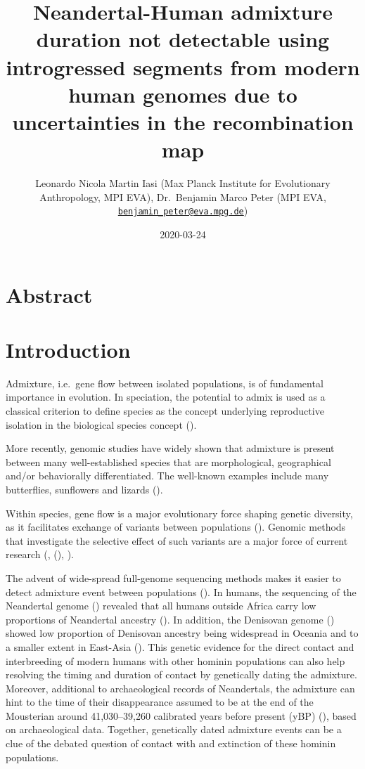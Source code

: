 \documentclass[]{article}
\title{Neandertal-Human admixture duration not detectable using introgressed
segments from modern human genomes due to uncertainties in the
recombination map}
\author{Leonardo Nicola Martin Iasi (Max Planck Institute for Evolutionary
Anthropology, MPI EVA), Dr.~Benjamin Marco Peter (MPI EVA,
\href{mailto:benjamin_peter@eva.mpg.de}{\nolinkurl{benjamin\_peter@eva.mpg.de}})}
\date{2020-03-24}
\begin{document}
\maketitle

\section{Abstract}\label{abstract}

\section{Introduction}\label{introduction}

Admixture, i.e.~gene flow between isolated populations,
 is of fundamental importance in evolution. In 
speciation, the  
potential to admix is used as a classical criterion to define  species as the concept underlying  reproductive
isolation in the biological species concept (\cite{mayr_animal_1963}).

More recently, genomic studies have widely shown that admixture is present between many well-established species that are morphological, geographical and/or behaviorally differentiated. The well-known examples include many butterflies, sunflowers and lizards (\cite{Salazar_Hybrid_speciation_2010, rieseberg_hybridization_2007,kronforst_multilocus_2006,kolbe_multiple_2007}). 

Within species, gene flow is a major evolutionary force  shaping genetic diversity, as it facilitates exchange of variants between populations
(\cite{harrison_hybridization_2014}). Genomic methods that investigate the selective effect of such variants  are a major force of current research (\cite{hedrick_adaptive_2013},
(\cite{shaw_genes_2011}), \cite{payseur_using_2010}).

The advent of wide-spread full-genome sequencing methods makes it easier to detect admixture event
between populations (\cite{sousa_understanding_2013}). In humans, the sequencing of
the Neandertal genome (\cite{green_draft_2010}) revealed that all humans outside Africa carry low proportions of Neandertal ancestry
(\cite{green_draft_2010,prufer_complete_2013,vernot_resurrecting_2014,fu_early_2015,fu_genome_2014,sankararaman_genomic_2014,prufer_high-coverage_2017}). In addition, the  Denisovan genome (\cite{reich_genetic_2010})
showed low proportion of Denisovan ancestry being widespread in Oceania and to a smaller extent in East-Asia
(\cite{reich_genetic_2010,meyer_high-coverage_2012,sankararaman_combined_2016,vernot_excavating_2016,malaspinas_genomic_2016}).
This genetic evidence for the direct contact and interbreeding of modern humans with other hominin populations can also help resolving the timing and duration of contact by genetically dating the admixture.
Moreover, additional to archaeological records of Neandertals, the admixture can hint to the time of their disappearance assumed to be at the end of the Mousterian around 41,030–39,260 calibrated years before present (yBP) (\cite{higham_timing_2014}), based on archaeological data. 
Together, genetically dated admixture events can be a clue of the debated question of contact with and extinction of these hominin populations.
\end{document}
